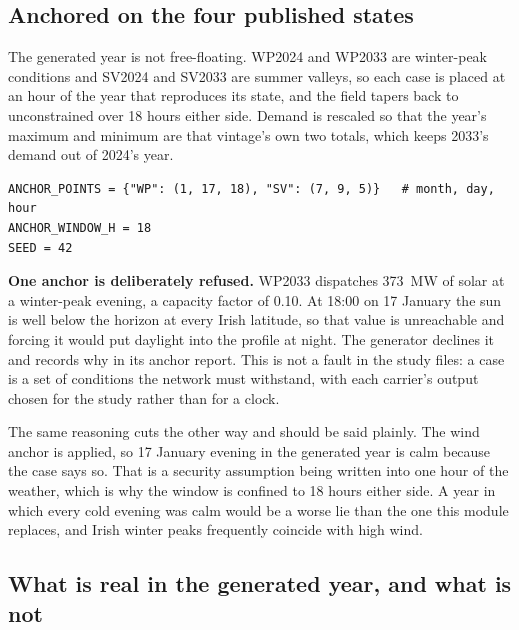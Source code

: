 \documentclass[11pt,a4paper]{article}
\begin{document}
\subsection{Anchored on the four published states}

The generated year is not free-floating. WP2024 and WP2033 are winter-peak
conditions and SV2024 and SV2033 are summer valleys, so each case is placed at
an hour of the year that reproduces its state, and the field tapers back to
unconstrained over 18 hours either side. Demand is rescaled so that the year's
maximum and minimum are that vintage's own two totals, which keeps 2033's
demand out of 2024's year.

\begin{lstlisting}
ANCHOR_POINTS = {"WP": (1, 17, 18), "SV": (7, 9, 5)}   # month, day, hour
ANCHOR_WINDOW_H = 18
SEED = 42
\end{lstlisting}

\textbf{One anchor is deliberately refused.} WP2033 dispatches 373~MW of solar
at a winter-peak evening, a capacity factor of 0.10. At 18:00 on 17 January the
sun is well below the horizon at every Irish latitude, so that value is
unreachable and forcing it would put daylight into the profile at night. The
generator declines it and records why in its anchor report. This is not a fault
in the study files: a case is a set of conditions the network must withstand,
with each carrier's output chosen for the study rather than for a clock.

The same reasoning cuts the other way and should be said plainly. The wind
anchor is applied, so 17 January evening in the generated year is calm because
the case says so. That is a security assumption being written into one hour of
the weather, which is why the window is confined to 18 hours either side.
A year in which every cold evening was calm would be a worse lie than the one
this module replaces, and Irish winter peaks frequently coincide with high
wind.

\subsection{What is real in the generated year, and what is not}
\end{document}
